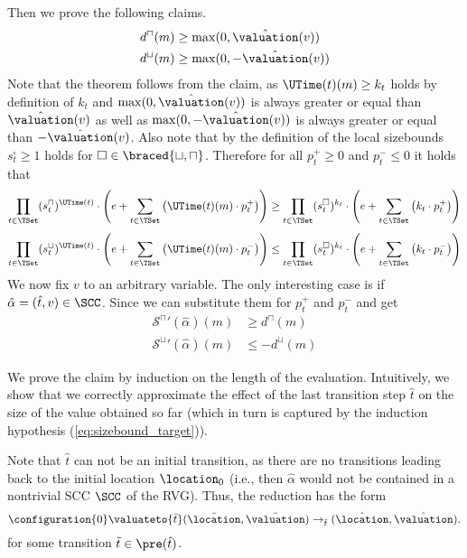Then we prove the following claims.
\begin{equation} \label{eq:sizebound_hypothesis}
  \begin{split}
    d^\sqcap(m) & \geq \max(0, \hat{\valuation}(v)) \\
    d^\sqcup(m) & \geq \max(0, -\hat{\valuation}(v))
  \end{split}
\end{equation}
Note that the theorem follows from the claim, as $\UTime(t)(m) \geq k_t$ holds by definition of $k_t$ and $\max(0, \hat{\valuation}(v))$ is always greater or equal than $\hat{\valuation}(v)$ as well as $\max(0, -\hat{\valuation}(v))$ is always greater or equal than $-\hat{\valuation}(v)$.
Also note that by the definition of the local sizebounds $s^\square_t \geq 1$ holds for $\square \in \braced{\sqcup, \sqcap}$.
Therefore for all $p^+_t \geq 0$ and $p^-_t \leq 0$ it holds that
\[ \prod_{t \in \TSet} (s^\sqcap_t)^{\UTime(t)} \cdot \left( e + \sum_{t \in \TSet} \left( \UTime(t)(m) \cdot p^+_t \right) \right) \geq \prod_{t \in \TSet} (s^\square_t)^{k_t} \cdot \left( e + \sum_{t \in \TSet} \left( k_t \cdot p^+_t \right) \right) \]
\[ \prod_{t \in \TSet} (s^\sqcup_t)^{\UTime(t)} \cdot \left( e + \sum_{t \in \TSet} \left( \UTime(t)(m) \cdot p^-_t \right) \right) \leq \prod_{t \in \TSet} (s^\square_t)^{k_t} \cdot \left( e + \sum_{t \in \TSet} \left( k_t \cdot p^-_t \right) \right) \]
We now fix $v$ to an arbitrary variable.
The only interesting case is if $\hat{\alpha} = (\hat{t}, v) \in \SCC$.
Since  we can substitute them for $p^+_t$ and $p^-_t$ and get
\begin{equation}
  \begin{split}
    {\mathcal{S}^\sqcap}'(\hat{\alpha})(m) & \geq d^\sqcap(m) \\
    {\mathcal{S}^\sqcup}'(\hat{\alpha})(m) & \leq -d^\sqcup(m)
  \end{split}
\end{equation}

We prove the claim by induction on the length of the evaluation.
Intuitively, we show that we correctly approximate the effect of the last transition step $\hat{t}$ on the size of the value obtained so far (which in turn is captured by the induction hypothesis (\ref{eq:sizebound_target})).

Note that $\hat{t}$ can not be an initial transition, as there are no transitions leading back to the initial location $\location_0$
(i.e., then $\hat{\alpha}$ would not be contained in a nontrivial SCC $\SCC$ of the RVG).
Thus, the reduction has the form
\[ \configuration{0} \valuateto{\tilde{t}} (\tilde{\location}, \tilde{\valuation}) \rightarrow_{\hat{t}} (\hat{\location}, \hat{\valuation}). \]
for some transition $\tilde{t} \in \pre(\hat{t})$.

